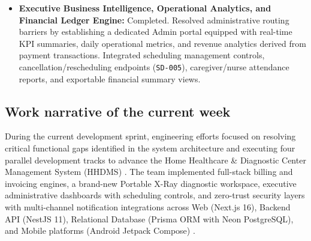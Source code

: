 \documentclass[onecolumn,journal]{IEEEtran}
\begin{document}
\begin{itemize}
		\item \textbf{Executive Business Intelligence, Operational Analytics, and Financial Ledger Engine:} Completed. Resolved administrative routing barriers by establishing a dedicated Admin portal equipped with real-time KPI summaries, daily operational metrics, and revenue analytics derived from payment transactions. Integrated scheduling management controls, cancellation/rescheduling endpoints (\texttt{SD-005}), caregiver/nurse attendance reports, and exportable financial summary views.
	\end{itemize}
	
	\subsection{Work narrative of the current week}
	During the current development sprint, engineering efforts focused on resolving critical functional gaps identified in the system architecture and executing four parallel development tracks to advance the Home Healthcare \& Diagnostic Center Management System (HHDMS) \cite{srs2026}. The team implemented full-stack billing and invoicing engines, a brand-new Portable X-Ray diagnostic workspace, executive administrative dashboards with scheduling controls, and zero-trust security layers with multi-channel notification integrations across Web (Next.js 16), Backend API (NestJS 11), Relational Database (Prisma ORM with Neon PostgreSQL), and Mobile platforms (Android Jetpack Compose) \cite{srs2026}.
\end{document}
